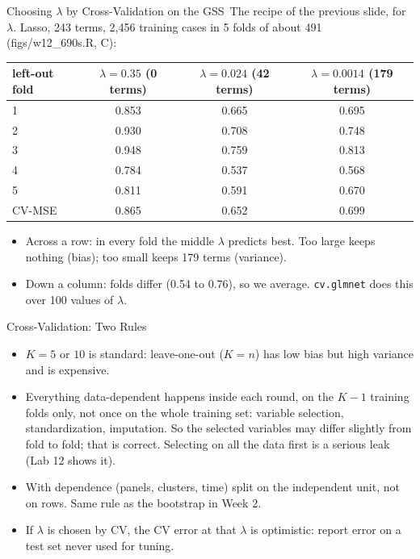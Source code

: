 \documentclass[aspectratio=169,11pt,xcolor=dvipsnames]{beamer}
\newcommand{\srcp}[1]{{\scriptsize\color{gray}(#1)}}
\newcommand{\core}{\,\raisebox{0.6pt}{\textcolor{corestar}{$\bigstar$}}}
\begin{document}
\begin{frame}{Choosing $\lambda$ by Cross-Validation on the GSS\core}
The recipe of the previous slide, for $\lambda$. Lasso, 243 terms, 2,456 training
cases in 5 folds of about 491 \srcp{figs/w12\_690s.R, C}:
\begin{center}\small
\renewcommand{\arraystretch}{1.1}
\begin{tabular}{@{}lccc@{}}
\toprule
left-out fold & $\lambda = 0.35$ (0 terms) & $\lambda = 0.024$ (42 terms) & $\lambda = 0.0014$ (179 terms) \\
\midrule
1 & 0.853 & 0.665 & 0.695 \\
2 & 0.930 & 0.708 & 0.748 \\
3 & 0.948 & 0.759 & 0.813 \\
4 & 0.784 & 0.537 & 0.568 \\
5 & 0.811 & 0.591 & 0.670 \\
\midrule
CV-MSE & 0.865 & \alert{0.652} & 0.699 \\
\bottomrule
\end{tabular}
\end{center}
\begin{itemize}\itemsep2pt\small
  \item Across a row: in every fold the middle $\lambda$ predicts best. Too large keeps
        nothing (bias); too small keeps 179 terms (variance).
  \item Down a column: folds differ (0.54 to 0.76), so we average. \texttt{cv.glmnet}
        does this over 100 values of $\lambda$.
\end{itemize}
\end{frame}

\begin{frame}{Cross-Validation: Two Rules\core}
\begin{itemize}\itemsep4pt
  \item $K = 5$ or $10$ is standard: leave-one-out ($K = n$) has low bias but high
        variance and is expensive.
  \item \alert{Everything data-dependent happens inside each round}, on the $K - 1$ training folds
        only, not once on the whole training set: variable selection, standardization,
        imputation. So the selected variables may differ slightly from fold to fold; that is
        correct. Selecting on all the data first is a serious leak (Lab 12 shows it).
  \item With dependence (panels, clusters, time) \alert{split on the independent
        unit}, not on rows. Same rule as the bootstrap in Week 2.
  \item If $\lambda$ is chosen by CV, the CV error at that $\lambda$ is optimistic:
        report error on a test set never used for tuning.
\end{itemize}
\end{frame}
\end{document}
